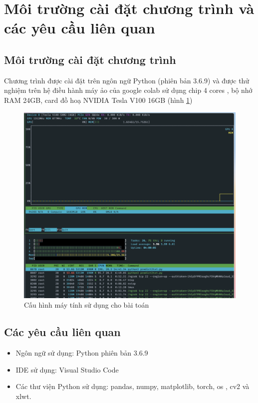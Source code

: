 \documentclass[a4paper, 12pt]{report}
\begin{document}
\section{Môi trường cài đặt chương trình và các yêu cầu liên quan}
\subsection{Môi trường cài đặt chương trình}
Chương trình được cài đặt trên ngôn ngữ Python (phiên bản 3.6.9) và được thử nghiệm trên hệ điều hành máy ảo của google colab sử dụng chip 4 cores , bộ nhớ RAM 24GB,  card đồ hoạ NVIDIA Tesla V100 16GB (hình \ref{fig:nvidia-smi})
 \begin{figure}[!h]
	\centering
	\includegraphics[width=0.8\linewidth]{Images/nvidia-smi}
	\caption{Cấu hình máy tính sử dụng cho bài toán}
	\label{fig:nvidia-smi}
\end{figure}
\subsection{Các yêu cầu liên quan}
\begin{itemize}
	\item Ngôn ngữ sử dụng: Python phiên bản 3.6.9
	\item IDE sử dụng: Visual Studio Code
	\item Các thư viện Python sử dụng: pandas, numpy, matplotlib,  torch, os , cv2 và xlwt.
\end{itemize}
\end{document}

